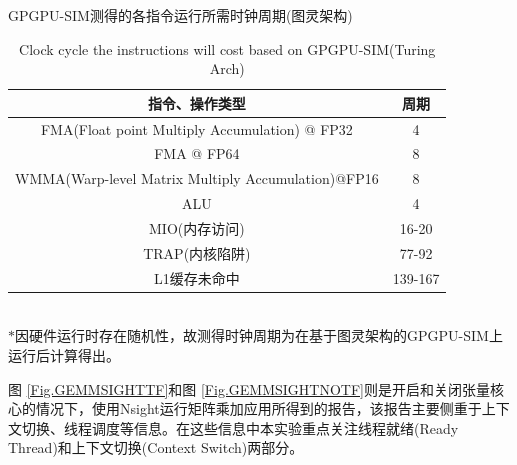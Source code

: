 \begin{table}
	\centering
	\renewcommand{\thetable}{\arabic{section}-\arabic{table} }
	\renewcommand{\tablename}{表}
	\caption{GPGPU-SIM测得的各指令运行所需时钟周期(图灵架构)}
	\addtocounter{table}{-1}
	\renewcommand{\thetable}{\arabic{section}-\arabic{table} }
	\renewcommand{\tablename}{Table}
	\caption{Clock cycle the instructions will cost based on GPGPU-SIM(Turing Arch)}
	\begin{tabular}{cc}
		\toprule
		指令、操作类型	&	周期\\
		\midrule
		FMA(Float point Multiply Accumulation) @ FP32 & 4 \\
		FMA @ FP64	&	8\\
		WMMA(Warp-level Matrix Multiply Accumulation)@FP16 & 8\\
		ALU 	&	4\\
		MIO(内存访问) & 16-20\\
		TRAP(内核陷阱) & 77-92\\
		L1缓存未命中 & 139-167\\
		\bottomrule
	\end{tabular} \label{table-时钟周期} \\
	
	$ * $因硬件运行时存在随机性，故测得时钟周期为在基于图灵架构的GPGPU-SIM上运行后计算得出。
\end{table}

\par 图 \ref{Fig.GEMMSIGHTTF}和图 \ref{Fig.GEMMSIGHTNOTF}则是开启和关闭张量核心的情况下，使用Nsight运行矩阵乘加应用所得到的报告，该报告主要侧重于上下文切换、线程调度等信息。在这些信息中本实验重点关注线程就绪(Ready Thread)和上下文切换(Context Switch)两部分。

